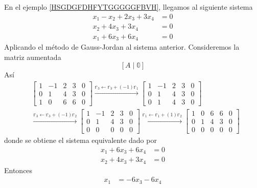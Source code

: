 \begin{example}
    En el ejemplo \ref{HSGDGFDHFYTGGGGGFBVH}, llegamos al siguiente sistema
    \begin{align*}
        x_1 - x_2 + 2x_3 + 3x_4 & = 0 \\
        x_2 + 4x_3 + 3x_4 & = 0 \\
        x_1 + 6x_3 + 6x_4 & = 0 
    \end{align*}
    Aplicando el método de Gauss-Jordan al sistema anterior. Consideremos la matriz aumentada
    $$[A \mid \mathbb{0}]$$
    Así
    \begin{align*}
        & \left[\begin{array}{rrrr|r}
            1 & -1 & 2 & 3 & 0 \\
            0 & 1 & 4 & 3 & 0 \\
            1 & 0 & 6 & 6 & 0
        \end{array}\right] \xrightarrow{\mathbb{r}_3 \leftarrow \mathbb{r}_3 + (-1) \mathbb{r}_1} \left[\begin{array}{rrrr|r}
            1 & -1 & 2 & 3 & 0 \\
            0 & 1 & 4 & 3 & 0 \\
            0 & 1 & 4 & 3 & 0
        \end{array}\right] \\
        & \xrightarrow{\mathbb{r}_3 \leftarrow \mathbb{r}_3 + (-1) \mathbb{r}_2} \left[\begin{array}{rrrr|r}
            1 & -1 & 2 & 3 & 0 \\
            0 & 1 & 4 & 3 & 0 \\
            0 & 0 & 0 & 0 & 0
        \end{array}\right] \xrightarrow{\mathbb{r}_1 \leftarrow \mathbb{r}_1 + (1) \mathbb{r}_2} \left[\begin{array}{rrrr|r}
            1 & 0 & 6 & 6 & 0 \\
            0 & 1 & 4 & 3 & 0 \\
            0 & 0 & 0 & 0 & 0
        \end{array}\right]
    \end{align*}
    donde se obtiene el sistema equivalente dado por
    \begin{align*}
        x_1 + 6x_3 + 6x_4 & = 0 \\
        x_2 + 4x_3 + 3x_4 & = 0
    \end{align*}
    Entonces
    \begin{align*}
        x_1 & = -6x_3 - 6x_4 \\

\end{align*}
\end{example}
